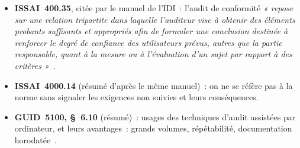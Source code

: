 \begin{itemize}
    \item \textbf{ISSAI~400.35}, citée par le manuel de l'IDI~: l'audit de
          conformité \textit{« repose sur une relation tripartite dans
          laquelle l'auditeur vise à obtenir des éléments probants suffisants
          et appropriés afin de formuler une conclusion destinée à renforcer
          le degré de confiance des utilisateurs prévus, autres que la partie
          responsable, quant à la mesure ou à l'évaluation d'un sujet par
          rapport à des critères »}~\cite{idi2021conformite}.
    \item \textbf{ISSAI~4000.14} (résumé d'après le même manuel)~: on ne se
          réfère pas à la norme sans signaler les exigences non suivies et
          leurs conséquences.
    \item \textbf{GUID~5100, §~6.10} (résumé)~: usages des techniques
          d'audit assistées par ordinateur, et leurs avantages~: grands
          volumes, répétabilité, documentation horodatée~\cite{intosai2019guid5100}.
\end{itemize}
